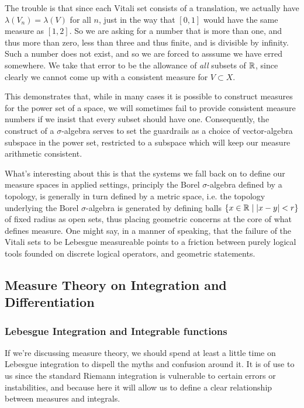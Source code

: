 \documentclass[11pt]{article}
\begin{document}
The trouble is that since each Vitali set consists of a translation, we actually have $\lambda(V_n) = \lambda(V)$ for all $n$, just in the way that $[0,1]$ would have the same measure as $[1,2]$. So we are asking for a number that is more than one, and thus more than zero, less than three and thus finite, and is divisible by infinity. Such a number does not exist, and so we are forced to asssume we have erred somewhere. We take that error to be the allowance of \emph{all} subsets of $\mathbb{R}$, since clearly we cannot come up with a consistent measure for $V \subset X$.

This demonstrates that, while in many cases it is possible to construct measures for the power set of a space, we will sometimes fail to provide consistent measure numbers if we insist that every subset should have one. Consequently, the construct of a $\sigma$-algebra serves to set the guardrails as a choice of vector-algebra subspace in the power set, restricted to a subspace which will keep our measure arithmetic consistent.

What's interesting about this is that the systems we fall back on to define our measure spaces in applied settings, principly the Borel $\sigma$-algebra defined by a topology, is generally in turn defined by a metric space, i.e. the topology underlying the Borel $\sigma$-algebra is generated by defining balls $\{x \in \mathbb{R} \mid |x - y| < r \}$ of fixed radius as open sets, thus placing geometric concerns at the core of what defines measure. One might say, in a manner of speaking, that the failure of the Vitali sets to be Lebesgue measureable points to a friction between purely logical tools founded on discrete logical operators, and geometric statements.

\subsection{Measure Theory on Integration and Differentiation}

\subsubsection{Lebesgue Integration and Integrable functions}

If we're discussing measure theory, we should spend at least a little time on Lebesgue integration to dispell the myths and confusion around it. It is of use to us since the standard Riemann integration is vulnerable to certain errors or instabilities, and because here it will allow us to define a clear relationship between measures and integrals.
\end{document}
